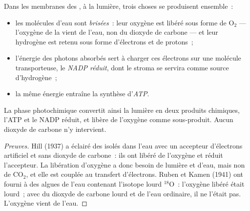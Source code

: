 \begin{proposition}\label{prop:g12:photosynthesis:lightphase}
Dans les membranes des , à la lumière, trois choses se
produisent ensemble~:
\begin{itemize}
  \item les molécules d'eau sont \emph{brisées}~: leur oxygène est
        libéré sous forme de $\mathrm{O_2}$ --- l'oxygène de la
         vient de l'eau, non du dioxyde de
        carbone --- et leur hydrogène est retenu sous forme
        d'électrons et de protons~;
  \item l'énergie des photons absorbés sert à charger ces électrons
        sur une molécule transporteuse, le \emph{NADP réduit}, dont le
        stroma se servira comme source d'hydrogène~;
  \item la même énergie entraîne la synthèse d'\emph{ATP}.
\end{itemize}
La phase photochimique convertit ainsi la lumière en deux produits
chimiques, l'ATP et le NADP réduit, et libère de l'oxygène comme
sous-produit. Aucun dioxyde de carbone n'y intervient.
\end{proposition}
\begin{proof}[Preuves]
Hill (1937) a éclairé des  isolés dans l'eau avec un
accepteur d'électrons artificiel et sans dioxyde de carbone~: ils ont
libéré de l'oxygène et réduit l'accepteur. La libération d'oxygène a
donc besoin de lumière et d'eau, mais non de $\mathrm{CO_2}$, et elle
est couplée au transfert d'électrons. Ruben et Kamen (1941) ont fourni
à des algues de l'eau contenant l'isotope lourd $^{18}$O~: l'oxygène
libéré était lourd~; avec du dioxyde de carbone lourd et de l'eau
ordinaire, il ne l'était pas. L'oxygène vient de l'eau.
\end{proof}

